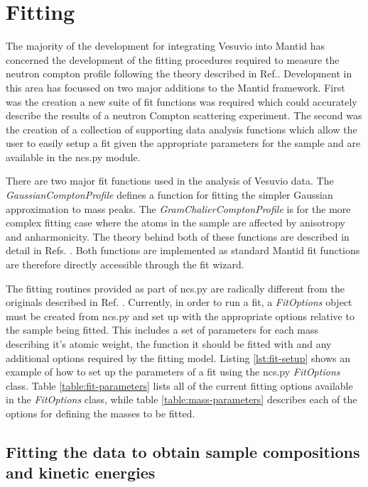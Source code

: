 \documentclass[paper=a4, fontsize=11pt]{scrartcl}	%
\numberwithin{equation}{section}															%
\numberwithin{figure}{section}																%
\numberwithin{table}{section}
\begin{document}
\section{Fitting}
\label{sec:fitting}
The majority of the development for integrating Vesuvio into Mantid has concerned the development of the fitting procedures required to measure the neutron compton profile following the theory described in Ref.\citep{mayers2012vesuvio}. Development in this area has focussed on two major additions to the Mantid framework. First was the creation a new suite of fit functions was required which could accurately describe the results of a neutron Compton scattering experiment. The second was the creation of a collection of supporting data analysis functions which allow the user to easily setup a fit given the appropriate parameters for the sample and are available in the ncs.py module.

There are two major fit functions used in the analysis of Vesuvio data. The \textit{GaussianComptonProfile} defines a function for fitting the simpler Gaussian approximation to mass peaks. The \textit{GramChalierComptonProfile} is for the more complex fitting case where the atoms in the sample are affected by anisotropy and anharmonicity. The theory behind both of these functions are described in detail in Refs. \cite{mayers2012vesuvio, andreani2005measurement}. Both functions are implemented as standard Mantid fit functions are therefore directly accessible through the fit wizard.

The fitting routines provided as part of ncs.py are radically different from the originals described in Ref. \cite{mayers2010user}. Currently, in order to run a fit, a \textit{FitOptions} object must be created from ncs.py and set up with the appropriate options relative to the sample being fitted. This includes a set of parameters for each mass describing it's atomic weight, the function it should be fitted with and any additional options required by the fitting model. Listing \ref{lst:fit-setup} shows an example of how to set up the parameters of a fit using the ncs.py \textit{FitOptions} class. Table \ref{table:fit-parameters} lists all of the current fitting options available in the \textit{FitOptions} class, while table \ref{table:mass-parameters} describes each of the options for defining the masses to be fitted.

\subsection{Fitting the data to obtain sample compositions and kinetic energies}
\label{subsec:fitting-composition-kinetic}
\end{document}

